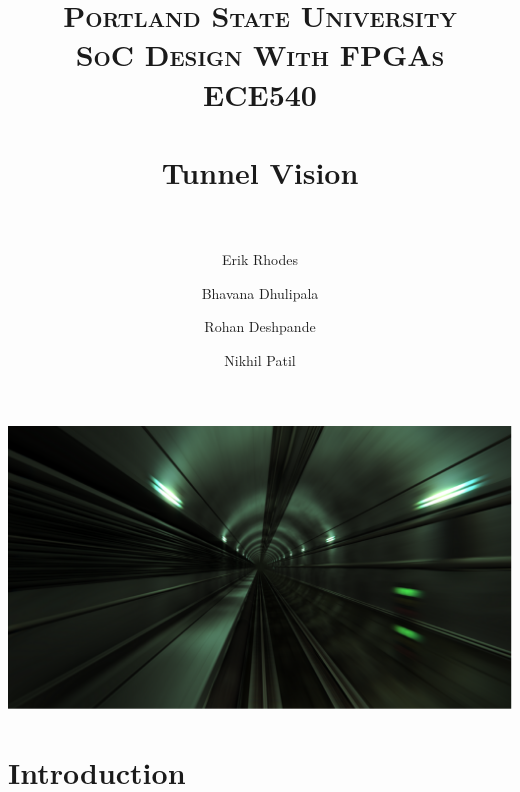 \documentclass[11pt]{article}
\title{	
\normalfont \normalsize 
\textsc{\LARGE Portland State University}\\[1.5cm] %
\textsc{\Large SoC Design With FPGAs}\\[0.5cm] %
\textsc{\large ECE540}\\[0.5cm] %
\horrule{1.2pt} \\[0.4cm] %
\huge Tunnel Vision \\ %
\horrule{1.2pt} \\[0.5cm] %
}
\begin{document}
\author{Erik Rhodes \and Bhavana Dhulipala \and Rohan Deshpande \and Nikhil Patil} %
\maketitle %
\thispagestyle{empty}


\vspace{1in}
\includegraphics[height=0.5\textwidth]{Images/tunnel_graphic.png}\\

%

%	




\section{Introduction} 
\end{document}
